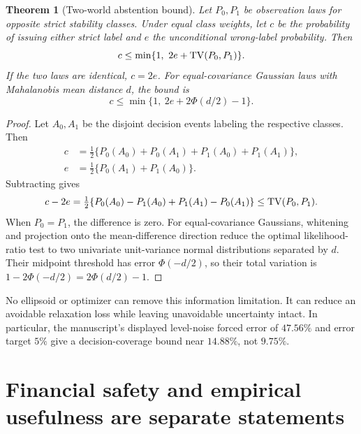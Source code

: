 \documentclass[11pt,a4paper]{article}
\newtheorem{theorem}{Theorem}[section]
\theoremstyle{definition}\newtheorem{definition}[theorem]{Definition}
\theoremstyle{remark}\newtheorem{remark}[theorem]{Remark}
\begin{document}
\begin{theorem}[Two-world abstention bound]\label{thm:abstention}
Let $P_0,P_1$ be observation laws for opposite strict stability classes. Under equal class weights, let $c$ be the probability of issuing either strict label and $e$ the unconditional wrong-label probability. Then
\[
 c\le\min\{1,\ 2e+\operatorname{TV}(P_0,P_1)\}.
\]
If the two laws are identical, $c=2e$. For equal-covariance Gaussian laws with Mahalanobis mean distance $d$, the bound is
\[
 c\le\min\{1,\ 2e+2\Phi(d/2)-1\}.
\]
\end{theorem}
\begin{proof}
Let $A_0,A_1$ be the disjoint decision events labeling the respective classes. Then
\begin{align*}
 c&=\tfrac12\{P_0(A_0)+P_0(A_1)+P_1(A_0)+P_1(A_1)\},\\
 e&=\tfrac12\{P_0(A_1)+P_1(A_0)\}.
\end{align*}
Subtracting gives
\[
 c-2e=\tfrac12\{P_0(A_0)-P_1(A_0)+P_1(A_1)-P_0(A_1)\}
 \le\operatorname{TV}(P_0,P_1).
\]
When $P_0=P_1$, the difference is zero. For equal-covariance Gaussians, whitening and projection onto the mean-difference direction reduce the optimal likelihood-ratio test to two univariate unit-variance normal distributions separated by $d$. Their midpoint threshold has error $\Phi(-d/2)$, so their total variation is $1-2\Phi(-d/2)=2\Phi(d/2)-1$.
\end{proof}

No ellipsoid or optimizer can remove this information limitation. It can reduce an avoidable relaxation loss while leaving unavoidable uncertainty intact. In particular, the manuscript's displayed level-noise forced error of $47.56\%$ and error target $5\%$ give a decision-coverage bound near $14.88\%$, not $9.75\%$.

\section{Financial safety and empirical usefulness are separate statements}
\end{document}
